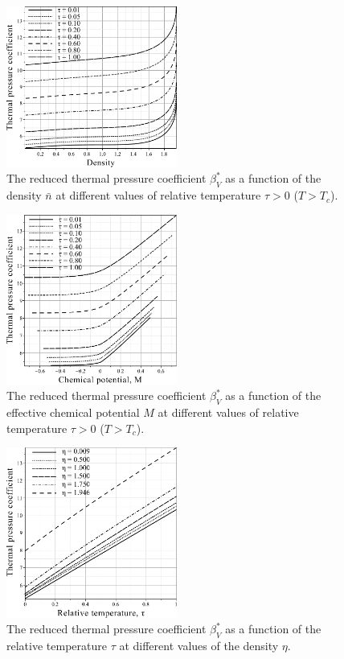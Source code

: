\documentclass[12pt]{article}
\begin{document}
	\begin{figure}[h!]
		\centering \includegraphics[width=0.5\textwidth]{f3a.pdf}
		\vskip-3mm\caption{The reduced thermal pressure coefficient $\beta^*_V$ as a function of the density $\bar n$ at different values of relative temperature $\tau > 0$ ($T > T_c$). 
		}\label{fig3a}
	\end{figure}
	\begin{figure}[h!]
		\centering \includegraphics[width=0.5\textwidth]{f3b.pdf}
		\vskip-3mm\caption{The reduced thermal pressure coefficient $\beta^*_V$ as a function of the effective chemical potential $M$ at different values of relative temperature $\tau > 0$ ($T > T_c$). 
		}\label{fig3b}
	\end{figure}
	\begin{figure}[h!]
		\centering \includegraphics[width=0.5\textwidth]{f3c.pdf}
		\vskip-3mm\caption{The reduced thermal pressure coefficient $\beta^*_V$ as a function of the relative temperature $\tau$ at different values of the density $\eta$. 
		}\label{fig3c}
	\end{figure}
	
\end{document}
